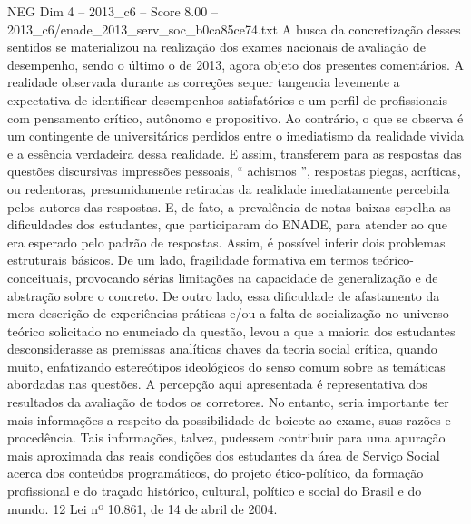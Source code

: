\begin{textsample}{NEG Dim 4 – 2013\_c6 – Score 8.00 – 2013\_c6/enade\_2013\_serv\_soc\_b0ca85ce74.txt}
A busca da concretização desses sentidos se materializou na realização dos exames nacionais de avaliação de desempenho, sendo o último o de 2013, agora objeto dos presentes comentários.
A realidade observada durante as correções sequer tangencia levemente a expectativa de identificar desempenhos satisfatórios e um perfil de profissionais com pensamento crítico, autônomo e propositivo.
Ao contrário, o que se observa é um contingente de universitários perdidos entre o imediatismo da realidade vivida e a essência verdadeira dessa realidade.
E assim, transferem para as respostas das questões discursivas impressões pessoais, “ achismos ”, respostas piegas, acríticas, ou redentoras, presumidamente retiradas da realidade imediatamente percebida pelos autores das respostas.
E, de fato, a prevalência de notas baixas espelha as dificuldades dos estudantes, que participaram do ENADE, para atender ao que era esperado pelo padrão de respostas.
Assim, é possível inferir dois problemas estruturais básicos.
De um lado, fragilidade formativa em termos teórico-conceituais, provocando sérias limitações na capacidade de generalização e de abstração sobre o concreto.
De outro lado, essa dificuldade de afastamento da mera descrição de experiências práticas e/ou a falta de socialização no universo teórico solicitado no enunciado da questão, levou a que a maioria dos estudantes desconsiderasse as premissas analíticas chaves da teoria social crítica, quando muito, enfatizando estereótipos ideológicos do senso comum sobre as temáticas abordadas nas questões.
A percepção aqui apresentada é representativa dos resultados da avaliação de todos os corretores.
No entanto, seria importante ter mais informações a respeito da possibilidade de boicote ao exame, suas razões e procedência.
Tais informações, talvez, pudessem contribuir para uma apuração mais aproximada das reais condições dos estudantes da área de Serviço Social acerca dos conteúdos programáticos, do projeto ético-político, da formação profissional e do traçado histórico, cultural, político e social do Brasil e do mundo. 12 Lei nº 10.861, de 14 de abril de 2004.

\end{textsample}

